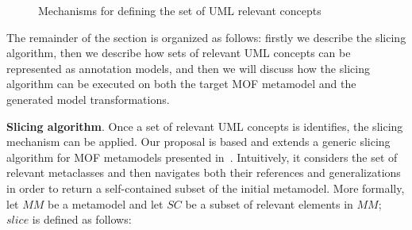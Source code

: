 \begin{figure}
	\hspace{2mm}
  \caption{Mechanisms for defining the set of UML relevant concepts}
  \label{fig:slicingIdea}
\end{figure}
%
The remainder of the section is organized as follows: firstly we describe the slicing algorithm, then we describe how sets of relevant UML concepts can be represented as annotation models, and then we will discuss how the slicing algorithm can be executed on both the target MOF metamodel and the generated model transformations.

\textbf{Slicing algorithm}. Once a set of relevant UML concepts is identifies, the slicing mechanism can be applied. Our proposal
is based and extends a generic slicing algorithm for MOF metamodels presented in~\cite{ICSEbyadl}. Intuitively,
it considers the set of relevant metaclasses and then navigates both their references and generalizations in order
to return a self-contained subset of the initial metamodel.
More formally, let $MM$ be a metamodel and let $SC$ be a subset of relevant elements in
$MM$; $slice$ is defined as follows:


